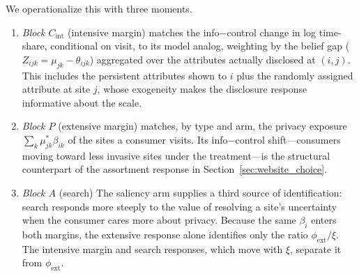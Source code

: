 \documentclass[12pt]{article}
\theoremstyle{definition}
\theoremstyle{remark}
\begin{document}
{We operationalize this with three moments. 
\begin{enumerate}
    \item \emph{Block $C_{\text{int}}$} (intensive margin) matches the info$-$control change in log time-share, conditional on visit, to its model analog, weighting by the belief gap ($Z_{ijk} = \mu_{jk} - \theta_{ijk}$) aggregated over the attributes actually disclosed at $(i,j)$. This includes the persistent attributes shown to $i$ plus the randomly assigned attribute at site $j$, whose exogeneity makes the disclosure response informative about the scale.
    \item \emph{Block $P$} (extensive margin) matches, by type and arm, the privacy exposure $\sum_k \mu^*_{jk}\beta_{ik}$ of the sites a consumer visits. Its info$-$control shift---consumers moving toward less invasive sites under the treatment---is the structural counterpart of the assortment response in Section~\ref{sec:website_choice}.
    \item \emph{Block $A$} (search) The saliency arm supplies a third source of identification: search responds more steeply to the value of resolving a site's uncertainty when the consumer cares more about privacy. Because the same $\beta_i$ enters both margins, the extensive response alone identifies only the ratio $\phi_{\text{ext}}/\xi$. The intensive margin and search responses, which move with $\xi$, separate it from $\phi_{\text{ext}}$.
\end{enumerate}

}
\end{document}
